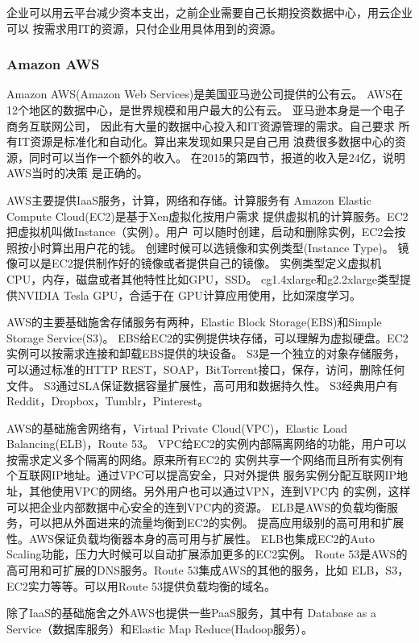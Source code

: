 企业可以用云平台减少资本支出，之前企业需要自己长期投资数据中心，用云企业可以
按需求用IT的资源，只付企业用具体用到的资源。

\subsubsection{Amazon AWS}
Amazon AWS(Amazon Web Services)是美国亚马逊公司提供的公有云。
AWS在12个地区的数据中心，是世界规模和用户最大的公有云。
亚马逊本身是一个电子商务互联网公司，
因此有大量的数据中心投入和IT资源管理的需求。自己要求
所有IT资源是标准化和自动化。算出来发现如果只是自己用
浪费很多数据中心的资源，同时可以当作一个额外的收入。
在2015的第四节，报道的收入是24亿，说明AWS当时的决策
是正确的。

AWS主要提供IaaS服务，计算，网络和存储。计算服务有
Amazon Elastic Compute Cloud(EC2)是基于Xen虚拟化按用户需求
提供虚拟机的计算服务。EC2把虚拟机叫做Instance（实例）。用户
可以随时创建，启动和删除实例，EC2会按照按小时算出用户花的钱。
创建时候可以选镜像和实例类型(Instance Type)。
镜像可以是EC2提供制作好的镜像或者提供自己的镜像。
实例类型定义虚拟机CPU，内存，磁盘或者其他特性比如GPU，SSD。
cg1.4xlarge和g2.2xlarge类型提供NVIDIA Tesla GPU，合适于在
GPU计算应用使用，比如深度学习。

AWS的主要基础施舍存储服务有两种，Elastic Block Storage(EBS)和Simple Storage Service(S3)。
EBS给EC2的实例提供块存储，可以理解为虚拟硬盘。EC2实例可以按需求连接和卸载EBS提供的块设备。
S3是一个独立的对象存储服务，可以通过标准的HTTP REST，SOAP，BitTorrent接口，保存，访问，删除任何文件。
S3通过SLA保证数据容量扩展性，高可用和数据持久性。
S3经典用户有Reddit，Dropbox，Tumblr，Pinterest。\cite{wiki:s3}

AWS的基础施舍网络有，Virtual Private Cloud(VPC)，Elastic Load Balancing(ELB)，Route 53。
VPC给EC2的实例内部隔离网络的功能，用户可以按需求定义多个隔离的网络。原来所有EC2的
实例共享一个网络而且所有实例有个互联网IP地址。通过VPC可以提高安全，只对外提供
服务实例分配互联网IP地址，其他使用VPC的网络。另外用户也可以通过VPN，连到VPC内
的实例，这样可以把企业内部数据中心安全的连到VPC内的资源。
ELB是AWS的负载均衡服务，可以把从外面进来的流量均衡到EC2的实例。
提高应用级别的高可用和扩展性。AWS保证负载均衡器本身的高可用与扩展性。
ELB也集成EC2的Auto Scaling功能，压力大时候可以自动扩展添加更多的EC2实例。
Route 53是AWS的高可用和可扩展的DNS服务。Route 53集成AWS的其他的服务，比如
ELB，S3，EC2实力等等。可以用Route 53提供负载均衡的域名。

除了IaaS的基础施舍之外AWS也提供一些PaaS服务，其中有
Database as a Service（数据库服务）和Elastic Map Reduce(Hadoop服务）。


